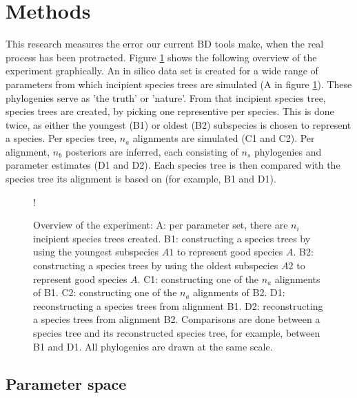 \section{Methods}

This research measures the error our current BD tools make, when
the real process has been protracted. Figure \ref{fig:experiment} shows
the following overview of the experiment graphically. 
An in silico data set is created for a wide
range of parameters from which incipient species trees are simulated (A in figure \ref{fig:experiment}). 
These phylogenies serve as 'the truth' or 'nature'. From that incipient species tree,
species trees are created, by picking one representive per species.
This is done twice, as either the youngest (B1) or oldest (B2) subspecies is chosen
to represent a species. Per species tree, $n_a$ alignments are simulated (C1 and C2).
Per alignment, $n_b$ posteriors are inferred, 
each consisting of $n_s$ phylogenies and parameter estimates (D1 and D2). Each
species tree is then compared with the species tree its alignment is based on (for
example, B1 and D1).

\begin{figure}
  \centering 
  \resizebox {0.8\textwidth} {!} {
    \CreateTikzFigureExperiment{} 
  }
  \caption{
    Overview of the experiment: 
    A: per parameter set, there are $n_i$ incipient species trees created. 
    B1: constructing a species trees by using the youngest subspecies $A1$ to represent good species $A$.
    B2: constructing a species trees by using the oldest subspecies $A2$ to represent good species $A$.
    C1: constructing one of the $n_a$ alignments of B1. 
    C2: constructing one of the $n_a$ alignments of B2. 
    D1: reconstructing a species trees from alignment B1.
    D2: reconstructing a species trees from alignment B2.
    Comparisons are done between a species tree and its reconstructed species tree, 
    for example, between B1 and D1.
    All phylogenies are drawn at the same scale.
  }
  \label{fig:experiment}
\end{figure}

\subsection{Parameter space}
\label{subsec:parameter_space}

